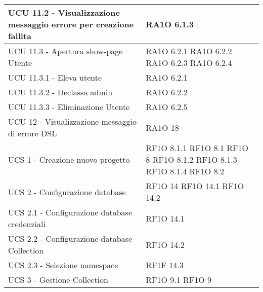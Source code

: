 \begin{center}
\begin{longtable}{ | p{5cm} | p{5cm} |}
            UCU 11.2 - Visualizzazione messaggio errore per creazione fallita &  RA1O 6.1.3 \newline  \\ \hline      
            UCU 11.3 - Apertura show-page Utente &  RA1O 6.2.1 \newline  RA1O 6.2.2 \newline  RA1O 6.2.3 \newline  RA1O 6.2.4 \newline  \\ \hline      
            UCU 11.3.1 - Eleva utente &  RA1O 6.2.1 \newline  \\ \hline      
            UCU 11.3.2 - Declassa admin &  RA1O 6.2.2 \newline  \\ \hline      
            UCU 11.3.3 - Eliminazione Utente &  RA1O 6.2.5 \newline  \\ \hline      
            UCU 12 - Visualizzazione messaggio di errore DSL &  RA1O 18 \newline  \\ \hline      
            UCS 1 - Creazione nuovo progetto &  RF1O 8.1.1 \newline  RF1O 8.1  \newline  RF1O 8 \newline  RF1O 8.1.2 \newline  RF1O 8.1.3 \newline  RF1O 8.1.4 \newline  RF1O 8.2 \newline  \\ \hline      
            UCS 2 - Configurazione database &  RF1O 14 \newline  RF1O 14.1 \newline  RF1O 14.2 \newline  \\ \hline      
            UCS 2.1  - Configurazione database credenziali &  RF1O 14.1 \newline  \\ \hline      
            UCS 2.2  - Configurazione database Collection &  RF1O 14.2 \newline  \\ \hline      
            UCS 2.3  - Selezione namespace &  RF1F 14.3 \newline  \\ \hline      
            UCS 3 - Gestione Collection &  RF1O 9.1 \newline  RF1O 9 \newline  \\ \hline      

\end{longtable}
\end{center}
